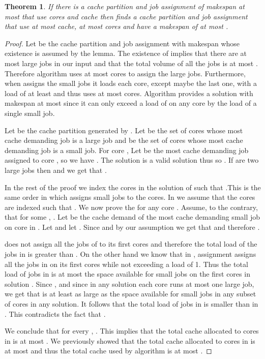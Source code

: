 \documentclass[11pt]{article}
\newtheorem{theorem}{Theorem}[section]
\begin{document}
\begin{theorem}\label{proof_32}
If there is a cache partition and job assignment of makespan at most  that use  cores and  cache then  finds a cache partition and job assignment that use at most  cache, at most  cores and have a makespan of at most .
\end{theorem}
\begin{proof}
Let  be  the cache partition and job assignment  with makespan  whose existence is assumed by the lemma. The existence of  implies that there are at most  large jobs in our input and that the total volume of all the jobs is at most . Therefore algorithm   uses at most  cores to assign the large jobs. Furthermore, when   assigns the small jobs it loads each core, except maybe the last one, with a load of at least  and thus uses at most  cores.
Algorithm   provides a solution with makespan at most  since it can only exceed a load of  on any core by the load of a single small job.

Let  be the cache partition generated by  . Let  be the set of cores whose most cache demanding job is a large job and  be the set of cores whose most cache demanding job is a small job.
For core , Let  be the most cache demanding job assigned to core , so we have . The solution  is a valid solution thus  so . If  are two large jobs then  and we get that .

In the rest of the proof we index the cores in the solution of   such that .This is the same order in which    assigns small jobs to the cores. In  we assume that the cores are indexed such that .
We now prove the  for any core . Assume, to the contrary, that for some , . Let  be the cache demand of the most cache demanding small job on core  in .
Let  and let . Since  and by our assumption  we get that  and therefore .

 does not assign all the jobs of  to its first  cores and therefore the total load of the jobs in  is greater than  .
On the other hand we know that in , assignment  assigns all the jobs in  on its first  cores while not exceeding a load of 1. Thus the total load of jobs in  is at most the space available for small jobs on the first  cores in solution .
Since ,  and since in any solution each core runs at most one large job, we get that  is at least as large as the space available for small jobs in any subset of  cores in any solution.
It follows that the total load of jobs in  is smaller than in . This contradicts the fact that .

We conclude that for every , . This implies that the total cache allocated to cores in  is at most . We previously showed that the total cache allocated to cores in  is at most  and thus the total cache used by algorithm  is at most .


\end{proof}
\end{document}
